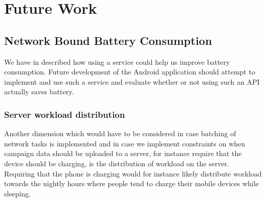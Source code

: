 
\chapter{Future Work}

\section{Network Bound Battery Consumption}
\label{sec:future_work_network_bound_battery_consumption}

We have in  described how using a  service could help us improve battery consumption. Future development of the Android application should attempt to implement and use such a service and evaluate whether or not using such an API actually saves battery.

\subsection{Server workload distribution}

Another dimension which would have to be considered in case batching of network tasks is implemented and in case we implement constraints on when campaign data should be uploaded to a server, for instance require that the device should be charging, is the distribution of workload on the server. Requiring that the phone is charging would for instance likely distribute workload towards the nightly hours where people tend to charge their mobile devices while sleeping.  

